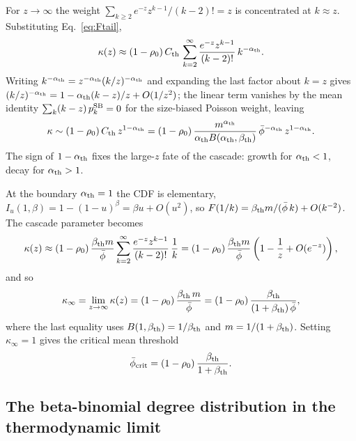 \documentclass[]{revtex4-2}
\begin{document}
For $z\to\infty$ the weight $\sum_{k\ge2} e^{-z}z^{k-1}/(k-2)! = z$ is concentrated at $k\approx z$. Substituting Eq.~\eqref{eq:Ftail},
\begin{equation}
    \kappa(z) \approx (1-\rho_0)\,C_{\rm th}\,
    \sum_{k=2}^{\infty} \frac{e^{-z}z^{k-1}}{(k-2)!}\,k^{-\alpha_{\rm th}}.
\end{equation}
Writing $k^{-\alpha_{\rm th}} = z^{-\alpha_{\rm th}}(k/z)^{-\alpha_{\rm th}}$ and expanding the last factor about $k=z$ gives $(k/z)^{-\alpha_{\rm th}} = 1 - \alpha_{\rm th}(k-z)/z + O(1/z^2)$; the linear term vanishes by the mean identity $\sum_k (k-z)\,p_k^{\rm SB}=0$ for the size-biased Poisson weight, leaving
\begin{equation}
    \kappa \sim (1-\rho_0)\,C_{\rm th}\,z^{1-\alpha_{\rm th}}
    = (1-\rho_0)\,\frac{m^{\alpha_{\rm th}}}{\alpha_{\rm th} B(\alpha_{\rm th},\beta_{\rm th})}
    \,\bar\phi^{-\alpha_{\rm th}}\,z^{1-\alpha_{\rm th}} .
\end{equation}
The sign of $1-\alpha_{\rm th}$ fixes the large-$z$ fate of the cascade: growth for $\alpha_{\rm th}<1$, decay for $\alpha_{\rm th}>1$.

At the boundary $\alpha_{\rm th}=1$ the CDF is elementary, $I_u(1,\beta) = 1-(1-u)^\beta = \beta u + O(u^2)$, so $F(1/k) = \beta_{\rm th} m/(\bar\phi\,k) + O(k^{-2})$. The cascade parameter becomes
\begin{equation}
    \kappa(z) \approx (1-\rho_0)\,\frac{\beta_{\rm th} m}{\bar\phi}
    \sum_{k=2}^{\infty}\frac{e^{-z}z^{k-1}}{(k-2)!}\,\frac{1}{k}
    = (1-\rho_0)\,\frac{\beta_{\rm th} m}{\bar\phi}\left(1 - \frac{1}{z} + O(e^{-z})\right),
\end{equation}
and so
\begin{equation}
    \kappa_\infty = \lim_{z\to\infty}\kappa(z)
    = (1-\rho_0)\,\frac{\beta_{\rm th}\,m}{\bar\phi}
    = (1-\rho_0)\,\frac{\beta_{\rm th}}{(1+\beta_{\rm th})\,\bar\phi},
    \label{eq:kappainf-univ}
\end{equation}
where the last equality uses $B(1,\beta_{\rm th})=1/\beta_{\rm th}$ and $m=1/(1+\beta_{\rm th})$. Setting $\kappa_\infty=1$ gives the critical mean threshold
\begin{equation}
    \bar\phi_{\rm crit} = (1-\rho_0)\,\frac{\beta_{\rm th}}{1+\beta_{\rm th}} .
\end{equation}

\subsection{The beta-binomial degree distribution in the thermodynamic limit}
\end{document}
